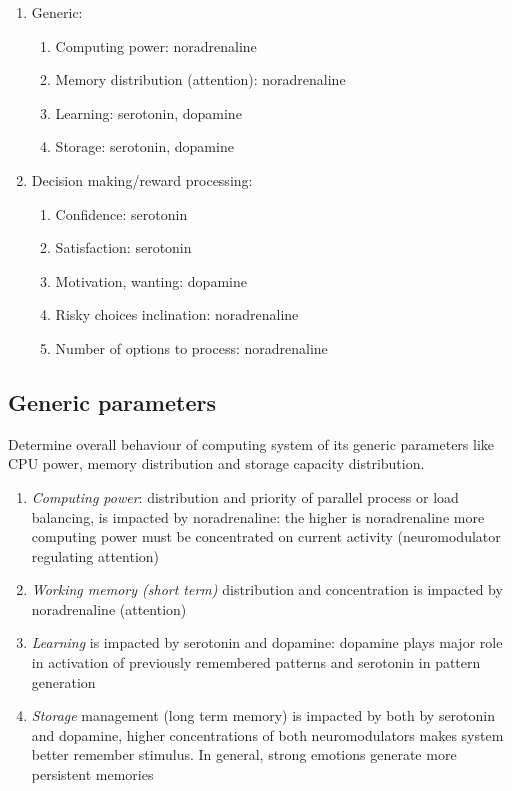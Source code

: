 \begin{enumerate}
 \item  Generic:
 \begin{enumerate}
  \item  Computing power: noradrenaline
  \item  Memory distribution (attention): noradrenaline
  \item  Learning: serotonin, dopamine
  \item  Storage: serotonin, dopamine
 \end{enumerate}
 \item  Decision making/reward processing:
 \begin{enumerate}
  \item  Confidence: serotonin
  \item  Satisfaction: serotonin
  \item  Motivation, wanting: dopamine
  \item  Risky choices inclination: noradrenaline
  \item  Number of options to process: noradrenaline
 \end{enumerate}
\end{enumerate}

\subsection{Generic parameters}

Determine overall behaviour of computing system of its generic parameters like CPU power, memory distribution and storage capacity distribution.

\begin{enumerate}
 \item  \emph{Computing power}: distribution and priority of parallel process or load balancing, is impacted by noradrenaline: the higher is noradrenaline more computing power must be concentrated on current activity (neuromodulator regulating attention)
 \item  \emph{Working memory (short term)} distribution and concentration is impacted by noradrenaline (attention)
 \item  \emph{Learning} is impacted by serotonin and dopamine: dopamine plays major role in activation of previously remembered patterns and serotonin in pattern generation
 \item  \emph{Storage} management (long term memory) is impacted by both by serotonin and dopamine, higher concentrations of both neuromodulators makes system better remember stimulus. In general, strong emotions generate more persistent memories
\end{enumerate}

